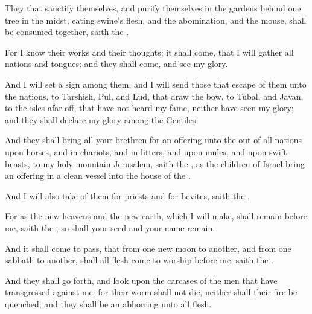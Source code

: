 \verse They that sanctify themselves, and purify themselves in the gardens behind one tree in the midst, eating swine's flesh, and the abomination, and the mouse, shall be consumed together, saith the \LORD.

\verse For I know their works and their thoughts: it shall come, that I will gather all nations and tongues; and they shall come, and see my glory.

\verse And I will set a sign among them, and I will send those that escape of them unto the nations, to Tarshish, Pul, and Lud, that draw the bow, to Tubal, and Javan, to the isles afar off, that have not heard my fame, neither have seen my glory; and they shall declare my glory among the Gentiles.

\verse And they shall bring all your brethren for an offering unto the \LORD out of all nations upon horses, and in chariots, and in litters, and upon mules, and upon swift beasts, to my holy mountain Jerusalem, saith the \LORD, as the children of Israel bring an offering in a clean vessel into the house of the \LORD.

\verse And I will also take of them for priests and for Levites, saith the \LORD.

\verse For as the new heavens and the new earth, which I will make, shall remain before me, saith the \LORD, so shall your seed and your name remain.

\verse And it shall come to pass, that from one new moon to another, and from one sabbath to another, shall all flesh come to worship before me, saith the \LORD.

\verse And they shall go forth, and look upon the carcases of the men that have transgressed against me: for their worm shall not die, neither shall their fire be quenched; and they shall be an abhorring unto all flesh.

